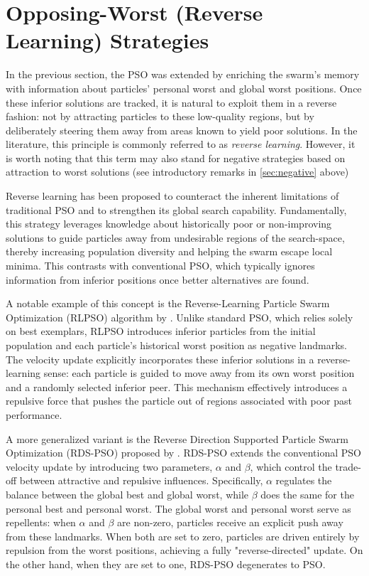 {\section{Opposing-Worst (Reverse Learning) Strategies}\label{sec:reverse-learning}


In the previous section, the PSO was extended by enriching the swarm’s memory with information about particles' personal worst and global worst positions. Once these inferior solutions are tracked, it is natural to exploit them in a reverse fashion: not by attracting particles to these low-quality regions, but by deliberately steering them away from areas known to yield poor solutions.
In the literature, this principle is commonly referred to as \textit{reverse learning}.  However, it is worth noting that this term may also stand for negative strategies based on attraction to worst solutions (see introductory remarks in \autoref{sec:negative} above)

Reverse learning has been proposed to counteract the inherent limitations of traditional PSO and to strengthen its global search capability. Fundamentally, this strategy leverages knowledge about historically poor or non-improving solutions to guide particles away from undesirable regions of the \gls{search-space}, thereby increasing population diversity and helping the swarm escape local minima. This contrasts with conventional PSO, which typically ignores information from inferior positions once better alternatives are found.

A notable example of this concept is the Reverse-Learning Particle Swarm Optimization (RLPSO) algorithm by \citet{xia2014reverselearning}. Unlike standard PSO, which relies solely on best exemplars, RLPSO introduces inferior particles from the initial population and each particle’s historical worst position as negative landmarks. The velocity update explicitly incorporates these inferior solutions in a reverse-learning sense: each particle is guided to move away from its own worst position and a randomly selected inferior peer. This mechanism effectively introduces a repulsive force that pushes the particle out of regions associated with poor past performance.

A more generalized variant is the Reverse Direction Supported Particle Swarm Optimization (RDS-PSO) proposed by \citet{comak2016generalized}. RDS-PSO extends the conventional PSO velocity update by introducing two parameters, $\alpha$ and $\beta$, which control the trade-off between attractive and repulsive influences. Specifically, $\alpha$ regulates the balance between the global best and global worst, while $\beta$ does the same for the personal best and personal worst. The global worst and personal worst serve as repellents: when $\alpha$ and $\beta$ are non-zero, particles receive an explicit push away from these landmarks. When both are set to zero, particles are driven entirely by repulsion from the worst positions, achieving a fully "reverse-directed" update. On the other hand, when they are set to one, RDS-PSO degenerates to PSO.

}
